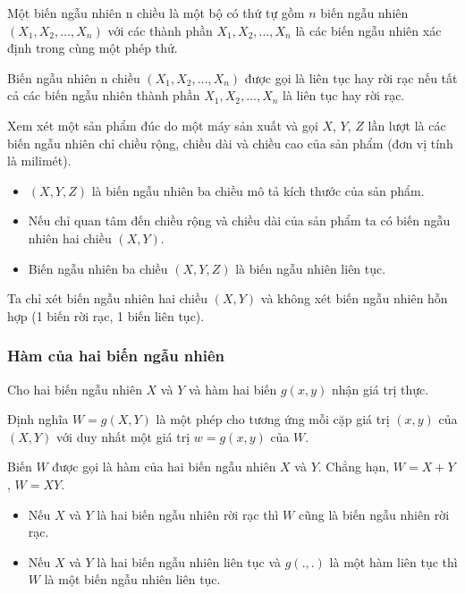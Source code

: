 \documentclass[12pt,a4paper]{article}
\begin{document}
\begin{dinhnghia}
  Một biến ngẫu nhiên n chiều là một bộ có thứ tự gồm $n$ biến ngẫu nhiên $(X_1, X_2, \ldots, X_n)$ với các thành phần $X_1, X_2, \ldots, X_n$ là các biến ngẫu nhiên xác định trong cùng một phép thử.

  Biến ngẫu nhiên n chiều $(X_1, X_2, \ldots, X_n)$ được gọi là liên tục hay rời rạc nếu tất cả các biến ngẫu nhiên thành phần $X_1, X_2, \ldots, X_n$ là liên tục hay rời rạc.
\end{dinhnghia}

\begin{vidu}[title={Sản phẩm đúc}]
Xem xét một sản phẩm đúc do một máy sản xuất và gọi $X$, $Y$, $Z$ lần lượt là các biến ngẫu nhiên chỉ chiều rộng, chiều dài và chiều cao của sản phẩm (đơn vị tính là milimét).
  \begin{itemize}
    \item $(X,Y,Z)$ là biến ngẫu nhiên ba chiều mô tả kích thước của sản phẩm.
    \item Nếu chỉ quan tâm đến chiều rộng và chiều dài của sản phẩm ta có biến ngẫu nhiên hai chiều $(X,Y)$.
    \item Biến ngẫu nhiên ba chiều $(X, Y, Z)$ là biến ngẫu nhiên liên tục.
  \end{itemize}
\end{vidu}

\begin{luuy}
  Ta chỉ xét biến ngẫu nhiên hai chiều $(X,Y)$ và không xét biến ngẫu nhiên hỗn hợp (1 biến rời rạc, 1 biến liên tục).
\end{luuy}

\subsubsection{Hàm của hai biến ngẫu nhiên}

\begin{dinhnghia}[title={Hàm của hai biến ngẫu nhiên}]
  Cho hai biến ngẫu nhiên $X$ và $Y$ và hàm hai biến $g(x, y)$ nhận giá trị thực.
  
  Định nghĩa $W = g(X, Y)$ là một phép cho tương ứng mỗi cặp giá trị $(x, y)$ của $(X, Y)$ với duy nhất một giá trị $w = g(x, y)$ của $W$.
  
  Biến $W$ được gọi là hàm của hai biến ngẫu nhiên $X$ và $Y$. Chẳng hạn, $W = X + Y$, $W = XY$.
\end{dinhnghia}

\begin{tinhchat}[title={Tính chất}]
\begin{itemize}
  \item Nếu $X$ và $Y$ là hai biến ngẫu nhiên rời rạc thì $W$ cũng là biến ngẫu nhiên rời rạc.
  \item Nếu $X$ và $Y$ là hai biến ngẫu nhiên liên tục và $g(., .)$ là một hàm liên tục thì $W$ là một biến ngẫu nhiên liên tục.
\end{itemize}
\end{tinhchat}
\end{document}
